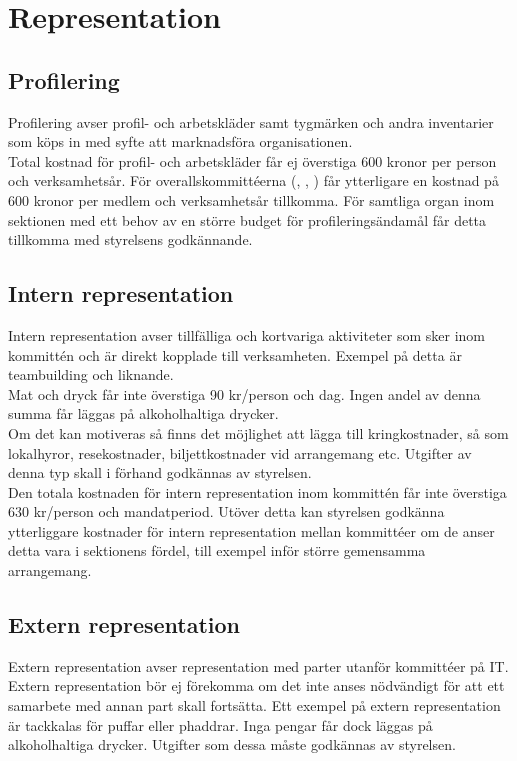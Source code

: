 \documentclass[11pt, includeaddress]{classes/cthit}
\begin{document}
\section{Representation}

\subsection{Profilering}
Profilering avser profil- och arbetskläder samt tygmärken och andra inventarier som köps in med syfte att marknadsföra organisationen. \\

Total kostnad för profil- och arbetskläder får ej överstiga 600 kronor per person och verksamhetsår. För overallskommittéerna (\NOLLKIT{}, \PRIT{}, \SEXIT{}) får ytterligare en kostnad på 600 kronor per medlem och verksamhetsår tillkomma. För samtliga organ inom sektionen med ett behov av en större budget för profileringsändamål får detta tillkomma med styrelsens godkännande.

\subsection{Intern representation}
Intern representation avser tillfälliga och kortvariga aktiviteter som sker inom kommittén och är direkt kopplade till verksamheten. Exempel på detta är teambuilding och liknande. \\

Mat och dryck får inte överstiga 90 kr/person och dag. Ingen andel av denna summa får läggas på alkoholhaltiga drycker. \\

Om det kan motiveras så finns det möjlighet att lägga till kringkostnader, så som lokalhyror, resekostnader, biljettkostnader vid arrangemang etc. Utgifter av denna typ skall i förhand godkännas av styrelsen. \\

Den totala kostnaden för intern representation inom kommittén får inte överstiga 630 kr/person och mandatperiod. Utöver detta kan styrelsen godkänna ytterliggare kostnader för intern representation mellan kommittéer om de anser detta vara i sektionens fördel, till exempel inför större gemensamma arrangemang.

\subsection{Extern representation}
Extern representation avser representation med parter utanför kommittéer på IT. Extern representation bör ej förekomma om det inte anses nödvändigt för att ett samarbete med annan part skall fortsätta. Ett exempel på extern representation är tackkalas för puffar eller phaddrar. Inga pengar får dock läggas på alkoholhaltiga drycker. Utgifter som dessa måste godkännas av styrelsen.
\end{document}
